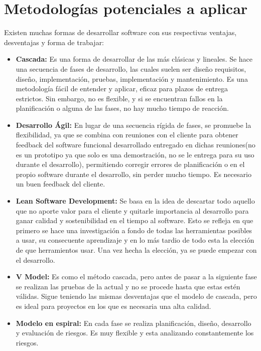 \section{Metodologías potenciales a aplicar}

Existen muchas formas de desarrollar software con sus respectivas ventajas, desventajas y forma de trabajar:

\begin{itemize}
	\item \textbf{Cascada:} Es una forma de desarrollar de las más clásicas y lineales. Se hace una secuencia de fases de desarrollo, las cuales suelen ser diseño requisitos, diseño, implementación, pruebas, implementación y mantenimiento. Es una metodología fácil de entender y aplicar, eficaz para plazos de entrega estrictos. Sin embargo, no es flexible, y si se encuentran fallos en la planificación o alguna de las fases, no hay mucho tiempo de reacción.
	\item \textbf{Desarrollo Ágil:} En lugar de una secuencia rígida de fases, se promuebe la flexibilidad, ya que se combina con reuniones con el cliente para obtener feedback del software funcional desarrollado entregado en dichas reuniones(no es un prototipo ya que solo es una demostración, no se le entrega para su uso durante el desarrollo), permitiendo corregir errores de planificación o en el propio software durante el desarrollo, sin perder mucho tiempo. Es necesario un buen feedback del cliente.
	\item \textbf{Lean Software Development: } Se basa en la idea de descartar todo aquello que no aporte valor para el cliente y quitarle importancia al desarrollo para ganar calidad y sostenibilidad en el tiempo al software. Esto se refleja en que primero se hace una investigación a fondo de todas las herramientas posibles a usar, su consecuente aprendizaje y en lo más tardio de todo esta la elección de que herramientos usar. Una vez hecha la elección, ya se puede empezar con el desarrollo.
	\item \textbf{V Model: } Es como el método cascada, pero antes de pasar a la siguiente fase se realizan las pruebas de la actual y no se procede hasta que estas estén válidas. Sigue teniendo las mismas desventajas que el modelo de cascada, pero es ideal para proyectos en los que es necesaria una alta calidad.
	\item \textbf{Modelo en espiral: } En cada fase se realiza planificación, diseño, desarrollo y evaluación de riesgos. Es muy flexible y esta analizando constantemente los riesgos.
\end{itemize}

